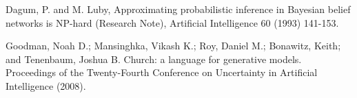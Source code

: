 \documentclass[10pt]{article}
\begin{document}
%
%
%
%
%
%
%
%


\pagebreak

\begin{thebibliography}{99}

 Dagum,  P.  and  M.  Luby,  Approximating probabilistic inference in Bayesian  belief networks is NP-hard  (Research  Note),  Artificial Intelligence 60  (1993)  141-153. 

 Goodman, Noah D.; Mansinghka, Vikash K.;
Roy, Daniel M.; Bonawitz, Keith; and Tenenbaum, Joshua B.  Church: a language for generative models.  Proceedings of the Twenty-Fourth Conference on Uncertainty in Artificial Intelligence (2008).

\end{thebibliography}
\end{document}
